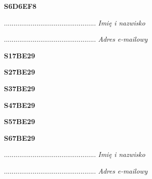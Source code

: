 \begin{turn}{90}\huge \textbf{S6D6EF8}\end{turn}

\begin{turn}{90}\begin{minipage}{\linewidth} \vspace{20mm} ................................................  \textit{Imię i nazwisko}\end{minipage}\end{turn}

\begin{turn}{90}\begin{minipage}{\linewidth} \vspace{20mm} ................................................  \textit{Adres e-mailowy}\end{minipage}\end{turn}

\begin{turn}{90}\huge \textbf{S17BE29}\end{turn}

\begin{turn}{90}\huge \textbf{S27BE29}\end{turn}

\begin{turn}{90}\huge \textbf{S37BE29}\end{turn}

\begin{turn}{90}\huge \textbf{S47BE29}\end{turn}

\begin{turn}{90}\huge \textbf{S57BE29}\end{turn}

\begin{turn}{90}\huge \textbf{S67BE29}\end{turn}

\begin{turn}{90}\begin{minipage}{\linewidth} \vspace{20mm} ................................................  \textit{Imię i nazwisko}\end{minipage}\end{turn}

\begin{turn}{90}\begin{minipage}{\linewidth} \vspace{20mm} ................................................  \textit{Adres e-mailowy}\end{minipage}\end{turn}

